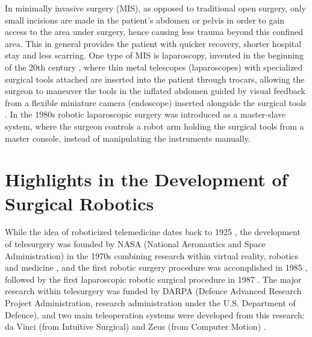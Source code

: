 In minimally invasive surgery (MIS), as opposed to traditional open surgery, only small incisions are made in the patient's abdomen or pelvis in order to gain access to the area under surgery, hence causing less trauma beyond this confined area. This in general provides the patient with quicker recovery, shorter hospital stay and less scarring.
One type of MIS is laparoscopy, invented in the beginning of the 20th century \citep{bib:laparoscopy}, where thin metal telescopes (laparoscopes) with specialized surgical tools attached are inserted into the patient through trocars, allowing the surgeon to maneuver the tools in the inflated abdomen guided by visual feedback from a flexible miniature camera (endoscope) inserted alongside the surgical tools \citep{bib:fascrs}.
In the 1980s robotic laparoscopic surgery was introduced as a master-slave system, where the surgeon controls a robot arm holding the surgical tools from a master console, instead of manipulating the instruments manually.

\section{Highlights in the Development of Surgical Robotics}
While the idea of roboticized telemedicine dates back to 1925 \citep{bib:telemed_predict}, the development of telesurgery was founded by NASA (National Aeronautics and Space Administration) in the 1970s \citep{bib:telesurg_history} combining research within virtual reality, robotics and medicine \citep{bib:brown_univ}, and the first robotic surgery procedure was accomplished in 1985 \citep{bib:telesurg_history}, followed by the first laparoscopic robotic surgical procedure in 1987 \citep{bib:brown_univ}.
The major research within telesurgery was funded by DARPA (Defence Advanced Research Project Administration, research administration under the U.S. Department of Defence), and two main teleoperation systems were developed from this research: da Vinci (from Intuitive Surgical) and Zeus (from Computer Motion) \citep{bib:telesurg_history}.




